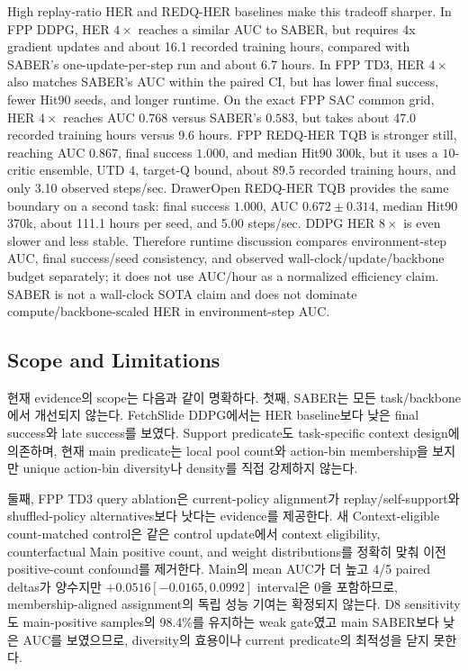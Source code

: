 \documentclass[letterpaper]{article}
\begin{document}
High replay-ratio HER and REDQ-HER baselines make this tradeoff sharper. In FPP DDPG, HER \(4\times\) reaches a similar AUC to SABER, but requires 4x gradient updates and about 16.1 recorded training hours, compared with SABER's one-update-per-step run and about 6.7 hours. In FPP TD3, HER \(4\times\) also matches SABER's AUC within the paired CI, but has lower final success, fewer Hit90 seeds, and longer runtime. On the exact FPP SAC common grid, HER \(4\times\) reaches AUC \(0.768\) versus SABER's \(0.583\), but takes about 47.0 recorded training hours versus 9.6 hours. FPP REDQ-HER TQB is stronger still, reaching AUC \(0.867\), final success \(1.000\), and median Hit90 300k, but it uses a \(10\)-critic ensemble, UTD \(4\), target-Q bound, about 89.5 recorded training hours, and only 3.10 observed steps/sec. DrawerOpen REDQ-HER TQB provides the same boundary on a second task: final success \(1.000\), AUC \(0.672\pm0.314\), median Hit90 370k, about 111.1 hours per seed, and 5.00 steps/sec. DDPG HER \(8\times\) is even slower and less stable. Therefore runtime discussion compares environment-step AUC, final success/seed consistency, and observed wall-clock/update/backbone budget separately; it does not use AUC/hour as a normalized efficiency claim. SABER is not a wall-clock SOTA claim and does not dominate compute/backbone-scaled HER in environment-step AUC.

\subsection{Scope and Limitations}

현재 evidence의 scope는 다음과 같이 명확하다. 첫째, SABER는 모든 task/backbone에서 개선되지 않는다. FetchSlide DDPG에서는 HER baseline보다 낮은 final success와 late success를 보였다. Support predicate도 task-specific context design에 의존하며, 현재 main predicate는 local pool count와 action-bin membership을 보지만 unique action-bin diversity나 density를 직접 강제하지 않는다.

둘째, FPP TD3 query ablation은 current-policy alignment가 replay/self-support와 shuffled-policy alternatives보다 낫다는 evidence를 제공한다. 새 Context-eligible count-matched control은 같은 control update에서 context eligibility, counterfactual Main positive count, and weight distributions를 정확히 맞춰 이전 positive-count confound를 제거한다. Main의 mean AUC가 더 높고 4/5 paired deltas가 양수지만 \(+0.0516[-0.0165,0.0992]\) interval은 0을 포함하므로, membership-aligned assignment의 독립 성능 기여는 확정되지 않는다. D8 sensitivity도 main-positive samples의 98.4\%를 유지하는 weak gate였고 main SABER보다 낮은 AUC를 보였으므로, diversity의 효용이나 current predicate의 최적성을 닫지 못한다.
\end{document}
